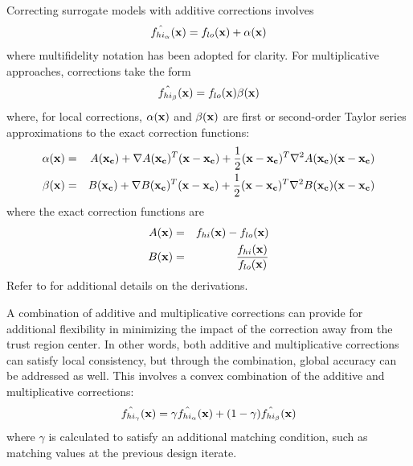 Correcting surrogate models with additive corrections involves
\begin{equation}
\hat{f_{hi_{\alpha}}}({\bf x}) = f_{lo}({\bf x}) + \alpha({\bf x}) 
\label{eq:correct_val_add}
\end{equation}
where multifidelity notation has been adopted for clarity.  For
multiplicative approaches, corrections take the form
\begin{equation}
\hat{f_{hi_{\beta}}}({\bf x}) = f_{lo}({\bf x}) \beta({\bf x})
\label{eq:correct_val_mult}
\end{equation}
where, for local corrections, $\alpha({\bf x})$ and $\beta({\bf x})$
are first or second-order Taylor series approximations to the exact
correction functions:
\begin{eqnarray}
\alpha({\bf x}) & = & A({\bf x_c}) + \nabla A({\bf x_c})^T 
({\bf x} - {\bf x_c}) + \frac{1}{2} ({\bf x} - {\bf x_c})^T 
\nabla^2 A({\bf x_c}) ({\bf x} - {\bf x_c}) \label{eq:taylor_a} \\
\beta({\bf x})  & = & B({\bf x_c}) + \nabla B({\bf x_c})^T 
({\bf x} - {\bf x_c}) + \frac{1}{2} ({\bf x} - {\bf x_c})^T \nabla^2 
B({\bf x_c}) ({\bf x} - {\bf x_c}) \label{eq:taylor_b}
\end{eqnarray}
where the exact correction functions are
\begin{eqnarray}
A({\bf x}) & = & f_{hi}({\bf x}) - f_{lo}({\bf x})       \label{eq:exact_A} \\
B({\bf x}) & = & \frac{f_{hi}({\bf x})}{f_{lo}({\bf x})} \label{eq:exact_B}
\end{eqnarray}
Refer to \cite{Eld04} for additional details on the derivations.

A combination of additive and multiplicative corrections can provide
for additional flexibility in minimizing the impact of the correction
away from the trust region center.  In other words, both additive and
multiplicative corrections can satisfy local consistency, but through
the combination, global accuracy can be addressed as well.  This
involves a convex combination of the additive and multiplicative
corrections:
\begin{equation}
\hat{f_{hi_{\gamma}}}({\bf x}) = \gamma \hat{f_{hi_{\alpha}}}({\bf x}) +
(1 - \gamma) \hat{f_{hi_{\beta}}}({\bf x}) \label{eq:combined_form}
\end{equation}
where $\gamma$ is calculated to satisfy an additional matching
condition, such as matching values at the previous design iterate.

